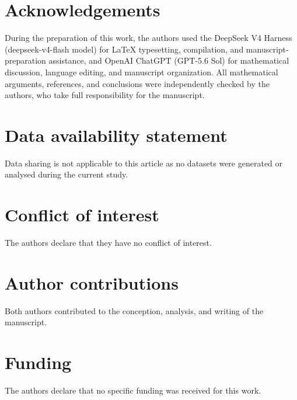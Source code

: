 \documentclass[10pt]{article}
\theoremstyle{plain}
\theoremstyle{definition}
\theoremstyle{remark}
\numberwithin{equation}{section}
\begin{document}
\vspace{1em}











\section*{Acknowledgements}
During the preparation of this work, the authors used the DeepSeek
V4 Harness (deepseek-v4-flash model) for \LaTeX{} typesetting,
compilation, and manuscript-preparation assistance, and OpenAI
ChatGPT (GPT-5.6 Sol) for mathematical discussion, language editing,
and manuscript organization.  All mathematical arguments,
references, and conclusions were independently checked by the
authors, who take full responsibility for the manuscript.

\section*{Data availability statement}
Data sharing is not applicable to this article as no datasets were
generated or analysed during the current study.

\section*{Conflict of interest}
The authors declare that they have no conflict of interest.

\section*{Author contributions}
Both authors contributed to the conception, analysis, and writing of
the manuscript.

\section*{Funding}
The authors declare that no specific funding was received for this
work.



\end{document}
